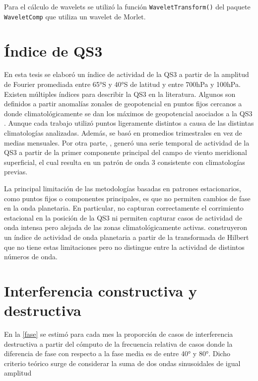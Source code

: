 \documentclass[spanish,a4paper,12pt,oneside]{book}
\begin{document}
Para el cálculo de wavelets se utilizó la función
\texttt{WaveletTransform()} del paquete \texttt{WaveletComp}
\citep{R-WaveletComp} que utiliza un wavelet de Morlet.

\section*{Índice de QS3}

En esta tesis se elaboró un índice de actividad de la QS3 a partir de la
amplitud de Fourier promediada entre 65°S y 40°S de latitud y entre
700hPa y 100hPa. Existen múltiples índices para describir la QS3 en la
literatura. Algunos son definidos a partir anomalías zonales de
geopotencial en puntos fijos cercanos a donde climatológicamente se dan
los máximos de geopotencial asociados a la QS3
\citep[ej.][\citet{Cai1999} y \citet{Raphael2004}]{Mo1985}. Aunque cada
trabajo utilizó puntos ligeramente distintos a causa de las distintas
climatologías analizadas. Además, \citet{Raphael2004} se basó en
promedios trimestrales en vez de medias mensuales. Por otra parte,
\citet{Yuan2008}, generó una serie temporal de actividad de la QS3 a
partir de la primer componente principal del campo de viento meridional
superficial, el cual resulta en un patrón de onda 3 consistente con
climatologías previas.

La principal limitación de las metodologías basadas en patrones
estacionarios, como puntos fijos o componentes principales, es que no
permiten cambios de fase en la onda planetaria. En particular, no
capturan correctamente el corrimiento estacional en la posición de la
QS3 \citep{Loon1972} ni permiten capturar casos de actividad de onda
intensa pero alejada de las zonas climatológicamente activas.
\citet{Irving2015} construyeron un índice de actividad de onda
planetaria a partir de la transformada de Hilbert que no tiene estas
limitaciones pero no distingue entre la actividad de distintos números
de onda.

\section*{Interferencia constructiva y destructiva}

En la \autoref{fase} se estimó para cada mes la proporción de casos de
interferencia destructiva a partir del cómputo de la frecuencia relativa
de casos donde la diferencia de fase con respecto a la fase media es de
entre 40° y 80°. Dicho criterio teórico surge de considerar la suma de
dos ondas sinusoidales de igual amplitud
\end{document}
